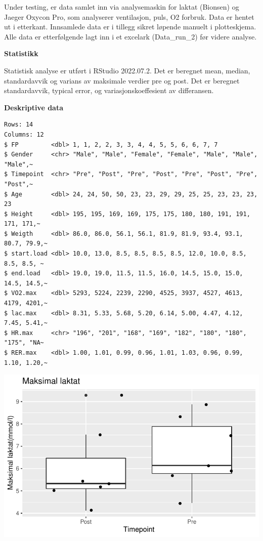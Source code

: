 \documentclass[
  letterpaper,
  DIV=11,
  numbers=noendperiod]{scrreprt}
\begin{document}
Under testing, er data samlet inn via analysemaskin for laktat (Bionsen)
og Jaeger Oxycon Pro, som analyserer ventilasjon, puls, O2 forbruk. Data
er hentet ut i etterkant. Innsamlede data er i tillegg sikret løpende
manuelt i plotteskjema. Alle data er etterfølgende lagt inn i et
excelark (Data\_run\_2) før videre analyse.

\textbf{Statistikk}

Statistisk analyse er utført i RStudio 2022.07.2. Det er beregnet mean,
median, standardavvik og varians av maksimale verdier pre og post. Det
er beregnet standardavvik, typical error, og variasjonskoeffesient av
differansen.

\textbf{Deskriptive data}

\begin{verbatim}
Rows: 14
Columns: 12
$ FP         <dbl> 1, 1, 2, 2, 3, 3, 4, 4, 5, 5, 6, 6, 7, 7
$ Gender     <chr> "Male", "Male", "Female", "Female", "Male", "Male", "Male",~
$ Timepoint  <chr> "Pre", "Post", "Pre", "Post", "Pre", "Post", "Pre", "Post",~
$ Age        <dbl> 24, 24, 50, 50, 23, 23, 29, 29, 25, 25, 23, 23, 23, 23
$ Height     <dbl> 195, 195, 169, 169, 175, 175, 180, 180, 191, 191, 171, 171,~
$ Weigth     <dbl> 86.0, 86.0, 56.1, 56.1, 81.9, 81.9, 93.4, 93.1, 80.7, 79.9,~
$ start.load <dbl> 10.0, 13.0, 8.5, 8.5, 8.5, 8.5, 12.0, 10.0, 8.5, 8.5, 8.5, ~
$ end.load   <dbl> 19.0, 19.0, 11.5, 11.5, 16.0, 14.5, 15.0, 15.0, 14.5, 14.5,~
$ VO2.max    <dbl> 5293, 5224, 2239, 2290, 4525, 3937, 4527, 4613, 4179, 4201,~
$ lac.max    <dbl> 8.31, 5.33, 5.68, 5.20, 6.14, 5.00, 4.47, 4.12, 7.45, 5.41,~
$ HR.max     <chr> "196", "201", "168", "169", "182", "180", "180", "175", "NA~
$ RER.max    <dbl> 1.00, 1.01, 0.99, 0.96, 1.01, 1.03, 0.96, 0.99, 1.10, 1.20,~
\end{verbatim}

\includegraphics{./part1_files/figure-pdf/unnamed-chunk-2-1.pdf}
\end{document}
